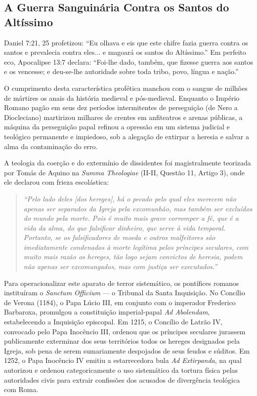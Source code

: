 \subsection{A Guerra Sanguinária Contra os Santos do Altíssimo}


Daniel 7:21, 25 profetizou: ``Eu olhava e eis que este chifre fazia guerra contra os santos e prevalecia contra eles... e magoará os santos do Altíssimo.'' Em perfeito eco, Apocalipse 13:7 declara: ``Foi-lhe dado, também, que fizesse guerra aos santos e os vencesse; e deu-se-lhe autoridade sobre toda tribo, povo, língua e nação.''

O cumprimento desta característica profética manchou com o sangue de milhões de mártires os anais da história medieval e pós-medieval. Enquanto o Império Romano pagão em seus dez períodos intermitentes de perseguição (de Nero a Diocleciano) martirizou milhares de crentes em anfiteatros e arenas públicas, a máquina da perseguição papal refinou a opressão em um sistema judicial e teológico permanente e impiedoso, sob a alegação de extirpar a heresia e salvar a alma da contaminação do erro.

A teologia da coerção e do extermínio de dissidentes foi magistralmente teorizada por Tomás de Aquino na \textit{Summa Theologiae} (II-II, Questão 11, Artigo 3), onde ele declarou com frieza escolástica:


\begin{quote}
\itshape ``Pelo lado deles [dos hereges], há o pecado pelo qual eles merecem não apenas ser separados da Igreja pela excomunhão, mas também ser excluídos do mundo pela morte. Pois é muito mais grave corromper a fé, que é a vida da alma, do que falsificar dinheiro, que serve à vida temporal. Portanto, se os falsificadores de moeda e outros malfeitores são imediatamente condenados à morte legítima pelos príncipes seculares, com muito mais razão os hereges, tão logo sejam convictos de heresia, podem não apenas ser excomungados, mas com justiça ser executados.''
\end{quote}


Para operacionalizar este aparato de terror sistemático, os pontífices romanos instituíram o \textit{Sanctum Officium} — o Tribunal da Santa Inquisição. No Concílio de Verona (1184), o Papa Lúcio III, em conjunto com o imperador Frederico Barbaroxa, promulgou a constituição imperial-papal \textit{Ad Abolendam}, estabelecendo a Inquisição episcopal. Em 1215, o Concílio de Latrão IV, convocado pelo Papa Inocêncio III, ordenou que os príncipes seculares jurassem publicamente exterminar dos seus territórios todos os hereges designados pela Igreja, sob pena de serem sumariamente despojados de seus feudos e súditos. Em 1252, o Papa Inocêncio IV emitiu a estarrecedora bula \textit{Ad Extirpanda}, na qual autorizou e ordenou categoricamente o uso sistemático da tortura física pelas autoridades civis para extrair confissões dos acusados de divergência teológica com Roma.

